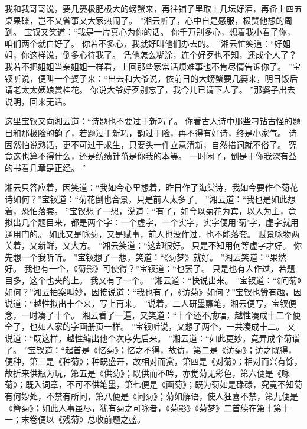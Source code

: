 我和我哥哥说，要几篓极肥极大的螃蟹来，再往铺子里取上几坛好酒，再备上四五桌果碟，岂不又省事又大家热闹了。
”湘云听了，心中自是感服，极赞他想的周到。
宝钗又笑道：“我是一片真心为你的话。
你千万别多心，想着我小看了你，咱们两个就白好了。
你若不多心，我就好叫他们办去的。
”湘云忙笑道：“好姐姐，你这样说，倒多心待我了。
凭他怎么糊涂，连个好歹也不知，还成个人了？我若不把姐姐当亲姐姐一样看，上回那些家常话烦难事也不肯尽情告诉你了。
”宝钗听说，便叫一个婆子来：“出去和大爷说，依前日的大螃蟹要几篓来，明日饭后请老太太姨娘赏桂花。
你说大爷好歹别忘了，我今儿已请下人了。
”那婆子出去说明，回来无话。
\par
这里宝钗又向湘云道：“诗题也不要过于新巧了。
你看古人诗中那些刁钻古怪的题目和那极险的韵了，若题过于新巧，韵过于险，再不得有好诗，终是小家气。
诗固然怕说熟话，更不可过于求生，只要头一件立意清新，自然措词就不俗了。
究竟这也算不得什么，还是纺绩针黹是你我的本等。
一时闲了，倒是于你我深有益的书看几章是正经。
”\par
湘云只答应着，因笑道：“我如今心里想着，昨日作了海棠诗，我如今要作个菊花诗如何？”宝钗道：“菊花倒也合景，只是前人太多了。
”湘云道：“我也是如此想着，恐怕落套。
”宝钗想了一想，说道：“有了，如今以菊花为宾，以人为主，竟拟出几个题目来，都是两个字：一个虚字，一个实字，实字便用‘菊’字，虚字就用通用门的。
如此又是咏菊，又是赋事，前人也没作过，也不能落套。
赋景咏物两关着，又新鲜，又大方。
”湘云笑道：“这却很好。
只是不知用何等虚字才好。
你先想一个我听听。
”宝钗想了一想，笑道：“《菊梦》就好。
”湘云笑道：“果然好。
我也有一个，《菊影》可使得？”宝钗道：“也罢了。
只是也有人作过，若题目多，这个也夹的上。
我又有了一个。
”湘云道：“快说出来。
”宝钗道：“《问菊》如何？”湘云拍案叫妙，因接说道：“我也有了，《访菊》如何？”宝钗也赞有趣，因说道：“越性拟出十个来，写上再来。
”说着，二人研墨蘸笔，湘云便写，宝钗便念，一时凑了十个。
湘云看了一遍，又笑道：“十个还不成幅，越性凑成十二个便全了，也如人家的字画册页一样。
”宝钗听说，又想了两个，一共凑成十二。
又说道：“既这样，越性编出他个次序先后来。
”湘云道：“如此更妙，竟弄成个菊谱了。
”宝钗道：“起首是《忆菊》；忆之不得，故访，第二是《访菊》；访之既得，便种，第三是《种菊》；种既盛开，故相对而赏，第四是《对菊》；相对而兴有馀，故折来供瓶为玩，第五是《供菊》；既供而不吟，亦觉菊无彩色，第六便是《咏菊》；既入词章，不可不供笔墨，第七便是《画菊》；既为菊如是碌碌，究竟不知菊有何妙处，不禁有所问，第八便是《问菊》；菊如解语，使人狂喜不禁，第九便是《簪菊》；如此人事虽尽，犹有菊之可咏者，《菊影》《菊梦》二首续在第十第十一；末卷便以《残菊》总收前题之盛。
